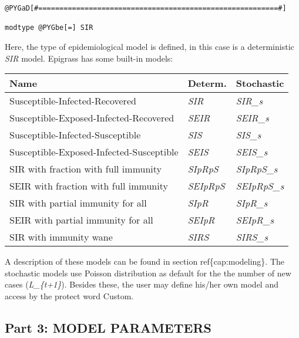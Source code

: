 \documentclass[a4paper,10pt]{manual}
\begin{document}
\begin{Verbatim}[commandchars=@\[\]]
@PYGaD[#=========================================================#]

modtype @PYGbe[=] SIR
\end{Verbatim}

Here, the type of epidemiological model is defined, in this case is a deterministic \emph{SIR} model. Epigrass has some built-in models:

\begin{tabulary}{\textwidth}{|L|L|L|}
\hline
\textbf{
Name
} & \textbf{
Determ.
} & \textbf{
Stochastic
}\\
\hline

Susceptible-Infected-Recovered
 & 
\emph{SIR}
 & 
\emph{SIR\_s}
\\

Susceptible-Exposed-Infected-Recovered
 & 
\emph{SEIR}
 & 
\emph{SEIR\_s}
\\

Susceptible-Infected-Susceptible
 & 
\emph{SIS}
 & 
\emph{SIS\_s}
\\

Susceptible-Exposed-Infected-Susceptible
 & 
\emph{SEIS}
 & 
\emph{SEIS\_s}
\\

SIR with fraction with full immunity
 & 
\emph{SIpRpS}
 & 
\emph{SIpRpS\_s}
\\

SEIR with fraction with full immunity
 & 
\emph{SEIpRpS}
 & 
\emph{SEIpRpS\_s}
\\

SIR with partial immunity for all
 & 
\emph{SIpR}
 & 
\emph{SIpR\_s}
\\

SEIR with partial immunity for all
 & 
\emph{SEIpR}
 & 
\emph{SEIpR\_s}
\\

SIR with immunity wane
 & 
\emph{SIRS}
 & 
\emph{SIRS\_s}
\\
\hline
\end{tabulary}


A description of these models can be found in section ref\{cap:modeling\}. The stochastic models use Poisson distribution as default for the the number of new cases (\emph{L\_\{t+1\}}). Besides these, the user may define his/her own model and access by the protect word Custom.


\subsection{Part 3: MODEL PARAMETERS}
\end{document}
